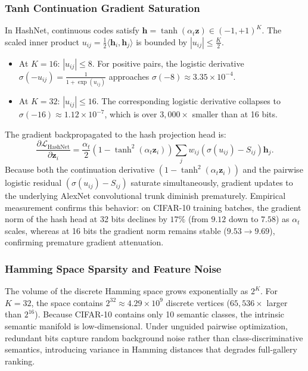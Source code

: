 \documentclass[10pt,conference]{IEEEtran}
\begin{document}
\subsubsection{Tanh Continuation Gradient Saturation}
In HashNet, continuous codes satisfy $\mathbf{h} = \tanh(\alpha_t \mathbf{z}) \in (-1, +1)^K$. The scaled inner product $u_{ij} = \frac{1}{2} \langle \mathbf{h}_i, \mathbf{h}_j \rangle$ is bounded by $|u_{ij}| \le \frac{K}{2}$.
\begin{itemize}
    \item At $K = 16$: $|u_{ij}| \le 8$. For positive pairs, the logistic derivative $\sigma(-u_{ij}) = \frac{1}{1 + \exp(u_{ij})}$ approaches $\sigma(-8) \approx 3.35 \times 10^{-4}$.
    \item At $K = 32$: $|u_{ij}| \le 16$. The corresponding logistic derivative collapses to $\sigma(-16) \approx 1.12 \times 10^{-7}$, which is over $3{,}000\times$ smaller than at 16 bits.
\end{itemize}
The gradient backpropagated to the hash projection head is:
\begin{equation}
    \frac{\partial \mathcal{L}_{\text{HashNet}}}{\partial \mathbf{z}_i} = \frac{\alpha_t}{2} (1 - \tanh^2(\alpha_t \mathbf{z}_i)) \sum_{j} w_{ij} (\sigma(u_{ij}) - S_{ij}) \mathbf{h}_j.
\end{equation}
Because both the continuation derivative $(1 - \tanh^2(\alpha_t \mathbf{z}_i))$ and the pairwise logistic residual $(\sigma(u_{ij}) - S_{ij})$ saturate simultaneously, gradient updates to the underlying AlexNet convolutional trunk diminish prematurely. Empirical measurement confirms this behavior: on CIFAR-10 training batches, the gradient norm of the hash head at 32 bits declines by $17\%$ (from $9.12$ down to $7.58$) as $\alpha_t$ scales, whereas at 16 bits the gradient norm remains stable ($9.53 \to 9.69$), confirming premature gradient attenuation.

\subsubsection{Hamming Space Sparsity and Feature Noise}
The volume of the discrete Hamming space grows exponentially as $2^K$. For $K = 32$, the space contains $2^{32} \approx 4.29 \times 10^9$ discrete vertices ($65{,}536\times$ larger than $2^{16}$). Because CIFAR-10 contains only 10 semantic classes, the intrinsic semantic manifold is low-dimensional. Under unguided pairwise optimization, redundant bits capture random background noise rather than class-discriminative semantics, introducing variance in Hamming distances that degrades full-gallery ranking.
\end{document}
